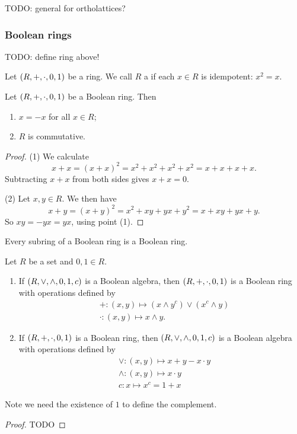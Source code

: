 TODO: general for ortholattices?

\subsubsection{Boolean rings}
TODO: define ring above!
\begin{definition}
Let $\sSet{R,+,\cdot, 0, 1}$ be a ring. We call $R$ a  if each $x\in R$ is idempotent: $x^2 = x$.
\end{definition}

\begin{lemma}
Let $\sSet{R,+,\cdot, 0, 1}$ be a Boolean ring. Then
\begin{enumerate}
\item $x = -x$ for all $x\in R$;
\item $R$ is commutative.
\end{enumerate}
\end{lemma}
\begin{proof}
(1) We calculate
\[ x+x = (x+x)^2 = x^2 + x^2 + x^2 + x^2 = x+x+x+x. \]
Subtracting $x+x$ from both sides gives $x+x = 0$.

(2) Let $x,y\in R$. We then have
\[ x+y = (x+y)^2 = x^2 + xy + yx + y^2 = x + xy + yx + y. \]
So $xy = -yx = yx$, using point (1).
\end{proof}

\begin{lemma}
Every subring of a Boolean ring is a Boolean ring.
\end{lemma}

\begin{proposition}
Let $R$ be a set and $0,1\in R$.
\begin{enumerate}
\item If $\sSet{R, \vee, \wedge, 0, 1, c}$ is a Boolean algebra, then $\sSet{R, +, \cdot, 0 , 1}$ is a Boolean ring with operations defined by
\begin{align*}
&+: (x,y) \mapsto (x\wedge y^c)\vee (x^c \wedge y) \\
&\cdot: (x,y) \mapsto x \wedge y.
\end{align*}
\item If $\sSet{R, +, \cdot, 0 , 1}$ is a Boolean ring, then $\sSet{R, \vee, \wedge, 0, 1, c}$ is a Boolean algebra with operations defined by
\begin{align*}
&\vee: (x,y) \mapsto x+y - x\cdot y \\
&\wedge: (x,y) \mapsto x \cdot y \\
&c: x\mapsto x^c = 1 + x
\end{align*}
\end{enumerate}
\end{proposition}
Note we need the existence of $1$ to define the complement.
\begin{proof}
TODO
\end{proof}

